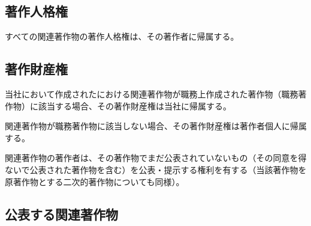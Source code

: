 

\subsection{著作人格権}
すべての関連著作物の著作人格権は、その著作者に帰属する。


\subsection{著作財産権}
当社において作成された\DMC における関連著作物が職務上作成された著作物（職務著作物）に該当する場合、その著作財産権は当社に帰属する。

関連著作物が職務著作物に該当しない場合、その著作財産権は著作者個人に帰属する。



\clearpage
関連著作物の著作者は、その著作物でまだ公表されていないもの（その同意を得ないで公表された著作物を含む）を公表・提示する権利を有する（当該著作物を原著作物とする二次的著作物についても同様）。


\subsection{公表する関連著作物}

